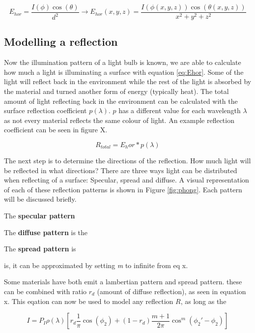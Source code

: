 \begin{equation}
\label{eq:Ehor}
E_{hor}=\frac{I(\phi)\cos(\theta)}{d^2} \to E_{hor}(x,y,z) = \frac{I(\phi(x,y,z))\cos(\theta(x,y,z))}{x^2+y^2+z^2}
\end{equation}

\subsection{Modelling a reflection}
\label{subsec:Modeling_of_reflection}
Now the illumination pattern of a light bulb is known, we are able to calculate how much a light is illuminating a surface with equation \ref{eq:Ehor}. Some of the light will reflect back in the environment while the rest of the light is absorbed by the material and turned another form of energy (typically heat). The total amount of light reflecting back in the environment can be calculated with the surface reflection coefficient $p(\lambda)$. $p$ has a different value for each wavelength $\lambda$ as not every material reflects the same colour of light. An example reflection coefficient can be seen in figure X.

\begin{equation}
\label{eq:R_total}
R_{total} = {E_hor} * p(\lambda)
\end{equation}

The next step is to determine the directions of the reflection. How much light will be reflected in what directions? There are three ways light can be distributed when reflecting of a surface: Specular, spread and diffuse. A visual representation of each of these reflection patterns is shown in Figure \ref{fig:phong}. Each pattern will be discussed briefly.

The \textbf{specular pattern} 

The \textbf{diffuse pattern} is the

The \textbf{spread pattern} is

 is, it can be approximated by setting \textit{m} to infinite from eq x.

Some materials have both emit a lambertian pattern and spread pattern. these can be combined with ratio $r_d$ (amount of diffuse reflection), as seen in equation x. This eqation can now be used to model any reflection $R$, as long as the 

\begin{equation}
\label{eq:Reflection}
I = P_{I}\rho(\lambda)\left[ r_{d} \frac{1}{\pi}\cos(\phi_2)+ (1-r_{d})\frac{m+1}{2\pi}\cos^m(\phi_2'-\phi_2) \right]
\end{equation}

